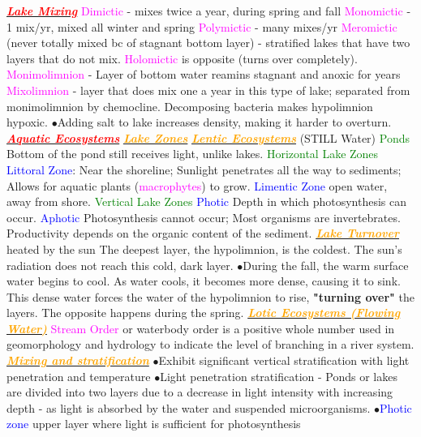 \documentclass{article}
\newcommand{\ddd}{$\bullet$}
\newcommand{\red}[1]{\textcolor{red}{#1}}
\newcommand{\green}[1]{\textcolor{green}{#1}}
\newcommand{\blue}[1]{\textcolor{blue}{#1}}
\newcommand{\pink}[1]{\textcolor{magenta}{#1}}
\newcommand{\orange}[1]{\textcolor{orange}{#1}}
\newcommand{\mysection}[1]{\underline{{\textbf{\textit{\red{#1}}}}}}
\newcommand{\mysubsection}[1]{\underline{\textbf{{\textit{\orange{#1}}}}}}
\newcommand{\mysubsub}[1]{{{\green{#1}}}}
\newcommand{\mysubsubsub}[1]{{{\blue{#1}}}}
\newcommand{\vocab}[1]{{\pink{#1}}}
\begin{document}
\begin{multicols*}{4}
    \mysection{Lake Mixing}
    	\vocab{Dimictic} - mixes twice a year, during spring and fall \vocab{Monomictic} - 1 mix/yr, mixed all winter and spring \vocab{Polymictic} - many mixes/yr \vocab{Meromictic} (never totally mixed bc of stagnant bottom layer) - stratified lakes that have two layers that do not mix. \vocab{Holomictic} is opposite (turns over completely). \vocab{Monimolimnion} - Layer of bottom water reamins stagnant and anoxic for years \vocab{Mixolimnion} - layer that does mix one a year in this type of lake; separated from monimolimnion by chemocline. Decomposing bacteria makes hypolimnion hypoxic. \ddd Adding salt to lake increases density, making it harder to overturn.
    \mysection{Aquatic Ecosystems}
        \mysubsection{Lake Zones}
            \mysubsection{Lentic Ecosystems} (STILL Water) 
            \mysubsub{Ponds} Bottom of the pond still receives light, unlike lakes.
            \mysubsub{Horizontal Lake Zones}
                \mysubsubsub{Littoral Zone}: Near the shoreline; Sunlight penetrates all the way to sediments; Allows for aquatic plants (\vocab{macrophytes}) to grow.
                \mysubsubsub{Limentic Zone} open water, away from shore.
            \mysubsub{Vertical Lake Zones}
                \mysubsubsub{Photic}
                    Depth in which photosynthesis can occur.
                \mysubsubsub{Aphotic}
                Photosynthesis cannot occur; Most organisms are invertebrates. Productivity depends on the organic content of the sediment.
          \mysubsection{Lake Turnover}
               heated by the sun The deepest layer, the hypolimnion, is the coldest. The sun's radiation does not reach this cold, dark layer. 
        	  \ddd During the fall, the warm surface water begins to cool. As water cools, it becomes more dense, causing it to sink. This dense water forces the water of the hypolimnion to rise, \textbf{"turning over"} the layers. The opposite happens during the spring.
        	  \mysubsection{Lotic Ecosystems (Flowing Water)}
        	  \vocab{Stream Order} or waterbody order is a positive whole number used in geomorphology and hydrology to indicate the level of branching in a river system. 
        \mysubsection{Mixing and stratification}
            \ddd Exhibit significant vertical stratification with light penetration and temperature 
            \ddd Light penetration stratification - Ponds or lakes are divided into two layers due to a decrease in light intensity with increasing depth - as light is absorbed by the water and suspended microorganisms.
            \ddd \blue{Photic zone} upper layer where light is sufficient for photosynthesis

\end{multicols*}
\end{document}

